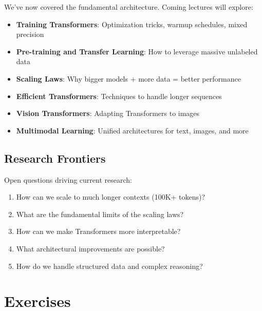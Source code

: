 \documentclass{article}
\begin{document}
We've now covered the fundamental architecture. Coming lectures will explore:

\begin{itemize}
\item \textbf{Training Transformers}: Optimization tricks, warmup schedules, mixed precision
\item \textbf{Pre-training and Transfer Learning}: How to leverage massive unlabeled data
\item \textbf{Scaling Laws}: Why bigger models + more data = better performance
\item \textbf{Efficient Transformers}: Techniques to handle longer sequences
\item \textbf{Vision Transformers}: Adapting Transformers to images
\item \textbf{Multimodal Learning}: Unified architectures for text, images, and more
\end{itemize}

\subsection{Research Frontiers}

Open questions driving current research:

\begin{enumerate}
\item How can we scale to much longer contexts (100K+ tokens)?
\item What are the fundamental limits of the scaling laws?
\item How can we make Transformers more interpretable?
\item What architectural improvements are possible?
\item How do we handle structured data and complex reasoning?
\end{enumerate}

\section{Exercises}
\end{document}
